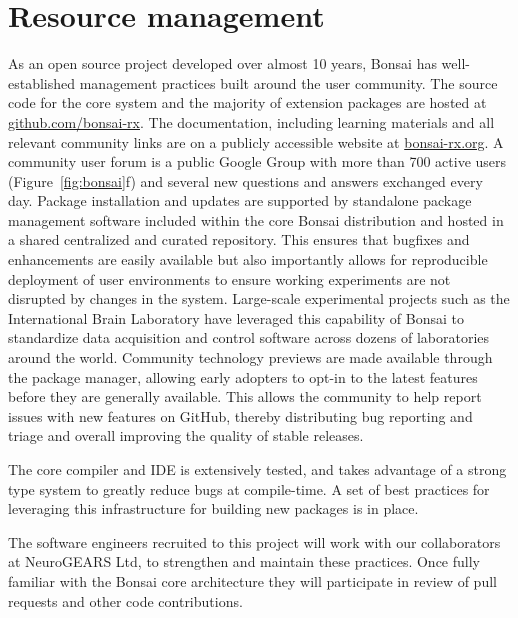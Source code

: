 \section{Resource management}
%
As an open source project developed over almost 10 years, Bonsai 
has well-established management practices built around the user community.
%
The source code for the core system and the majority of extension packages
are hosted at \url{github.com/bonsai-rx}.
%
The documentation, including learning materials and all relevant community
links are on a publicly accessible website at \url{bonsai-rx.org}.
%
A community user forum is a public Google Group with more than 700 active users (Figure~\ref{fig:bonsai}f) and several
new questions and answers exchanged every day.
%
Package installation and updates are supported by standalone package
management software included within the core Bonsai distribution and hosted
in a shared centralized and curated repository.
%
This ensures that bugfixes and enhancements are easily available but
also importantly allows for reproducible deployment of user environments
to ensure working experiments are not disrupted by changes in the system.
Large-scale experimental projects such as the International Brain Laboratory
have leveraged this capability of Bonsai to standardize data acquisition and
control software across dozens of laboratories around the world.
%
Community technology previews are made available through the package manager,
allowing early adopters to opt-in to the latest features
before they are generally available. This allows the community
to help report issues with new features on GitHub, thereby
distributing bug reporting and triage and overall improving the quality of
stable releases.

The core compiler and IDE is extensively tested, and takes advantage of
a strong type system to greatly reduce bugs at compile-time. A set of best
practices for leveraging this infrastructure for building new packages is
in place.

The software engineers recruited to this project will work with our
collaborators at NeuroGEARS Ltd, to strengthen and maintain these
practices.  Once fully familiar with the Bonsai core architecture they
will participate in review of pull requests and other code contributions.


